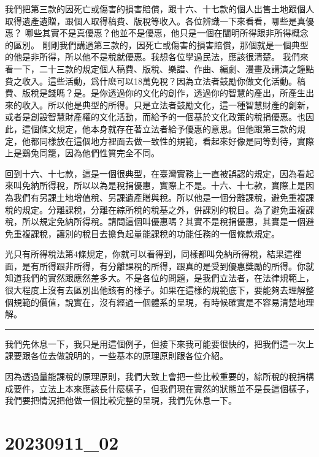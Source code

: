 \documentclass[]{ctexbook}
\begin{document}
我們把第三款的因死亡或傷害的損害賠償，跟十六、十七款的個人出售土地跟個人取得遺產遺贈，跟個人取得稿費、版稅等收入。各位辨識一下來看看，哪些是真優惠？ 哪些其實不是真優惠？他並不是優惠，他只是一個在闡明所得跟非所得概念的區別。
剛剛我們講過第三款的，因死亡或傷害的損害賠償，那個就是一個典型的他是非所得，所以他不是稅就優惠。我想各位學過民法，應該很清楚。
我們來看一下，二十三款的規定個人稿費、版稅、樂譜、作曲、編劇、漫畫及講演之鐘點費之收入。這些活動，爲什麽可以18萬免稅？因為立法者鼓勵你做文化活動。稿費、版稅是錢嗎？是。是你透過你的文化的創作，透過你的智慧的產出，所產生出來的收入。所以他是典型的所得。只是立法者鼓勵文化，這一種智慧財產的創新，或者是創設智慧財產權的文化活動，而給予的一個基於文化政策的稅捐優惠。也因此，這個條文規定，他本身就存在著立法者給予優惠的意思。但他跟第三款的規定，他都同樣放在這個地方裡面去做一致性的規範，看起來好像是同等對待，實際上是鷄兔同籠，因為他們性質完全不同。

回到十六、十七款，這是一個很典型，在臺灣實務上一直被誤認的規定，因為看起來叫免納所得稅，所以以為是稅捐優惠，實際上不是。十六、十七款，實際上是因為我們有另課土地增值稅、另課遺產贈與稅。所以他是一個分離課稅，避免重複課稅的規定。分離課稅，分離在綜所稅的稅基之外，併課別的稅目。為了避免重複課稅，所以規定免納所得稅。請問這個叫優惠嗎？其實不是稅捐優惠，其實是一個避免重複課稅，讓別的稅目去擔負起量能課稅的功能任務的一個條款規定。

光只有所得稅法第4條規定，你就可以看得到，同樣都叫免納所得稅，結果這裡面，是有所得跟非所得，有分離課稅的所得，跟真的是受到優惠獎勵的所得。你就知道我們的實然跟應然差多大。不是各位的問題，是我們立法者，在法律規範上，很大程度上沒有去區別出他該有的樣子。如果在這樣的規範底下，要能夠去理解整個規範的價值，說實在，沒有經過一個體系的呈現，有時候確實是不容易清楚地理解。

\begin{center}\rule{0.5\linewidth}{0.5pt}\end{center}

我們先休息一下，我只是用這個例子，但接下來我可能要很快的，把我們這一次上課要跟各位去做說明的，一些基本的原理原則跟各位介紹。

因為透過量能課稅的原理原則，我們大致上會把一些比較重要的，綜所稅的稅捐構成要件，立法上本來應該長什麼樣子，但我們現在實然的狀態並不是長這個樣子，我們要把情況把他做一個比較完整的呈現，我們先休息一下。

\hypertarget{section-4}{%
\chapter{20230911\_02}\label{section-4}}
\end{document}
